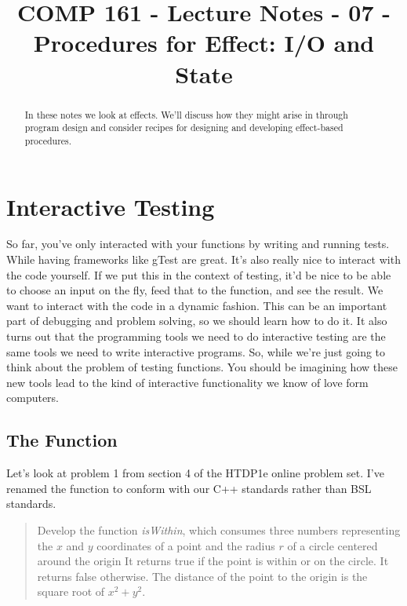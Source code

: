 \documentclass[]{tufte-handout}
\title{COMP 161 - Lecture Notes - 07 - Procedures for Effect: I/O and State}
\begin{document}
 
\maketitle

\begin{abstract}
In these notes we look at effects. We'll discuss how they might arise in through program design and consider recipes for designing and developing effect-based procedures.
\end{abstract}

\section{Interactive Testing}

So far, you've only interacted with your functions by writing and running tests. While having frameworks like gTest are great. It's also really nice to interact with the code yourself. If we put this in the context of testing, it'd be nice to be able to choose an input on the fly, feed that to the function, and see the result. We want to interact with the code in a dynamic fashion. This can be an important part of debugging and problem solving, so we should learn how to do it. It also turns out that the programming tools we need to do interactive testing are the same tools we need to write interactive programs. So, while we're just going to think about the problem of testing functions. You should be imagining how these new tools lead to the kind of interactive functionality we know of love form computers. 

\subsection{The Function}

Let's look at problem 1 from section 4 of the HTDP1e online problem set. I've renamed the function to conform with our C++ standards rather than BSL standards. 

\begin{framed}
\begin{quote}
Develop the function \textit{isWithin}, which consumes three numbers representing the $x$ and $y$ coordinates of a point and the radius $r$ of a circle centered around the origin It returns true if the point is within or on the circle. It returns false otherwise. The distance of the point to the origin is the square root of $x^2 + y^2$.
\end{quote}
\end{framed}
\end{document}
